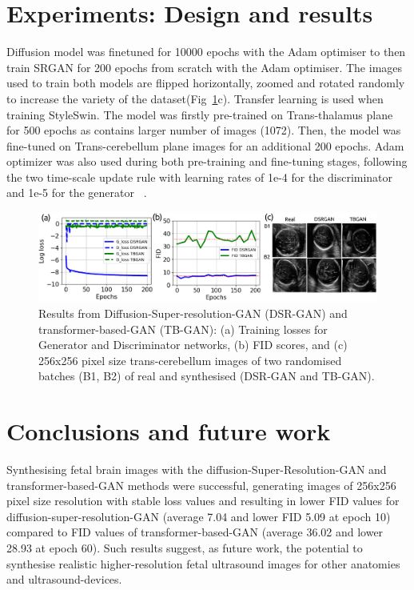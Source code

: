 \documentclass{midl} %
\begin{document}
\section{Experiments: Design and results}
Diffusion model was finetuned for 10000 epochs with the Adam optimiser to then train SRGAN for 200 epochs from scratch with the Adam optimiser. The images used to train both models are flipped horizontally, zoomed and rotated randomly to increase the variety of the dataset(Fig~\ref{fig:main_results}c).
Transfer learning is used when training StyleSwin. The model was firstly pre-trained on Trans-thalamus plane for 500 epochs as contains larger number of images (1072). Then, the model was fine-tuned on Trans-cerebellum plane images for an additional 200 epochs. Adam optimizer was also used during both pre-training and fine-tuning stages, following the two time-scale update rule with learning rates of 1e-4 for the discriminator and 1e-5 for the generator ~\cite{Heuvel2018}. 
\begin{figure}[htbp]
    \centering
    \includegraphics[width=0.99\columnwidth]{../figures/main-results/outputs/drawing-v00}%
\caption{
	Results from Diffusion-Super-resolution-GAN (DSR-GAN) and transformer-based-GAN (TB-GAN):
	(a) Training losses for Generator and Discriminator networks,
	(b) FID scores, and
	(c) 256x256 pixel size trans-cerebellum images of two randomised batches (B1, B2) of real and synthesised (DSR-GAN and TB-GAN).
    }
\label{fig:main_results}
\end{figure}    

\section{Conclusions and future work}
Synthesising fetal brain images with the diffusion-Super-Resolution-GAN and transformer-based-GAN methods were successful, generating images of 256x256 pixel size resolution with stable loss values and 
resulting in lower FID values for diffusion-super-resolution-GAN (average 7.04 and lower FID 5.09 at epoch 10) compared to FID values of transformer-based-GAN (average 36.02 and lower 28.93 at epoch 60).
Such results suggest, as future work, the potential to synthesise realistic higher-resolution fetal ultrasound images for other anatomies and ultrasound-devices.




%
\end{document}
